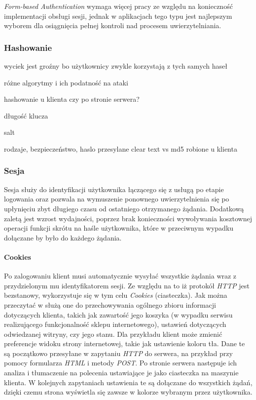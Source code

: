 \documentclass[11pt]{aghdpl}
\begin{document}
\emph{Form-based Authentication} wymaga więcej pracy ze względu na konieczność implementacji obsługi sesji, jednak w aplikacjach tego typu jest najlepszym wyborem dla osiągnięcia pełnej kontroli nad procesem uwierzytelniania.

\subsubsection{Hashowanie}
\label{sec:hashowanie}

wyciek jest groźny bo użytkownicy zwykle korzystają z tych samych haseł

różne algorytmy i ich podatność na ataki

hashowanie u klienta czy po stronie serwera?

długość klucza

salt

rodzaje, bezpieczeństwo, haslo przesylane clear text vs md5 robione u klienta

\subsubsection{Sesja}
\label{sec:sesja}

Sesja służy do identyfikacji użytkownika łączącego się z usługą po etapie logowania oraz pozwala na wymuszenie ponownego uwierzytelnienia się po upłynięciu zbyt długiego czasu od ostatniego otrzymanego żądania. Dodatkową zaletą jest wzrost wydajności, poprzez brak konieczności wywoływania kosztownej operacji funkcji skrótu na haśle użytkownika, które w przeciwnym wypadku dołączane by było do każdego żądania.

\paragraph{Cookies}
Po zalogowaniu klient musi automatycznie wysyłać wszystkie żądania wraz z przydzielonym mu identyfikatorem sesji. Ze względu na to iż protokół \emph{HTTP} jest bezstanowy, wykorzystuje się w tym celu \emph{Cookies} (ciasteczka). Jak można przeczytać w \cite{MsC} służą one do przechowywania ogólnego zbioru  informacji dotyczących klienta, takich jak zawartość jego koszyka (w wypadku serwisu realizującego funkcjonalność sklepu internetowego), ustawień dotyczących odwiedzanej witryny, czy jego stanu. Dla przykładu klient może zmienić preferencje widoku strony internetowej, takie jak ustawienie koloru tła. Dane te są początkowo przesyłane w zapytaniu \emph{HTTP} do serwera, na przykład przy pomocy formularza \emph{HTML} i metody \emph{POST}. Po stronie serwera następuje ich analiza i tłumaczenie na polecenia ustawiające je jako ciasteczka na maszynie klienta. W kolejnych zapytaniach ustawienia te są dołączane do wszystkich żądań, dzięki czemu strona wyświetla się zawsze w kolorze wybranym przez użytkownika.
\end{document}
